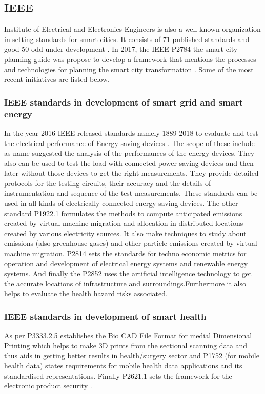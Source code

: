 \documentclass[sigconf]{acmart}
\begin{document}
\subsection{IEEE}
Institute of Electrical and Electronics Engineers is also a well known organization in setting standards for smart cities. It consists of 71 published standards and good 50 odd under development \cite{IEEE}.
In 2017, the IEEE P2784 the smart city planning guide was propose to develop a framework that mentions the processes and technologies for planning the smart city transformation \cite{lai2020review}. Some of the most recent initiatives are listed below.
\subsubsection{\textbf{IEEE standards in development of smart grid and smart energy}}
In the year 2016 IEEE released standards namely 1889-2018 to evaluate and test the electrical performance of Energy saving devices \citep{lai2020review}. The scope of these include as name suggested the analysis of the performances of the energy devices. They also can be used to test the load with connected power saving devices and then later without those devices to get the right measurements. They provide detailed protocols for the testing circuits, their accuracy and the details of instrumentation and sequence of the test measurements. These standards can be used in all kinds of electrically connected energy saving devices.
The other standard P1922.1 \cite{P1922.1} formulates the methods to compute anticipated emissions created by virtual machine migration and allocation in distributed locations created by various electricity sources. It also make techniques to study about emissions (also greenhouse gases) and other particle emissions created by virtual machine migration. P2814 \citep{P2814} sets the standards for techno economic metrics for operation and development of electrical energy systems and renewable energy systems. And finally the P2852 \citep{P2852} uses the artificial intelligence technology to get the accurate locations of infrastructure and surroundings.Furthermore it also helps to evaluate the health hazard risks associated.
\subsubsection{\textbf{IEEE standards in development of smart health}}
As per \cite{lai2020review} P3333.2.5 establishes the Bio CAD File Format for medial Dimensional Printing which helps to make 3D prints from the sectional scanning data and thus aids in getting better results in health/surgery sector and P1752 (for mobile health data) states requirements for mobile health data applications and its standardised representations. Finally P2621.1 sets the framework for the electronic product security \cite{IEEE}.
\end{document}
